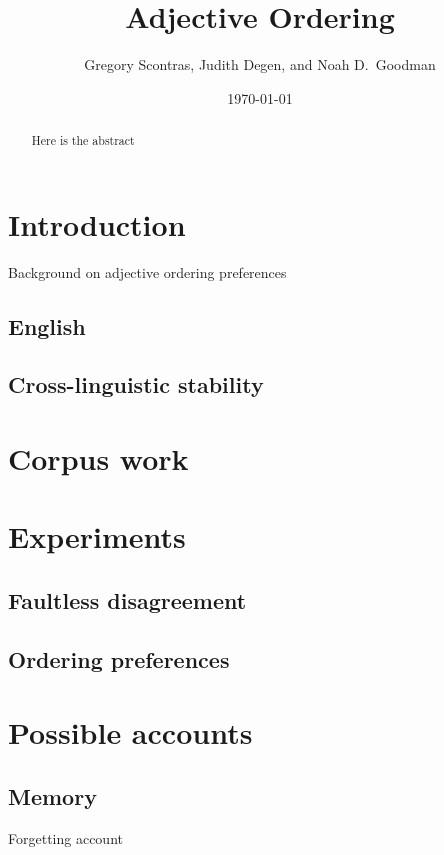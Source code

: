 \documentclass[11pt]{article}
\title{Adjective Ordering}
\author{Gregory Scontras, Judith Degen, and Noah D.~Goodman}
\date{\today}
\begin{document}
\thispagestyle{plain}

\maketitle

\begin{abstract}
	Here is the abstract
\end{abstract}


\section{Introduction}

Background on adjective ordering preferences

\subsection{English}

\subsection{Cross-linguistic stability}


\section{Corpus work}


\section{Experiments}

\subsection{Faultless disagreement}

\subsection{Ordering preferences}


\section{Possible accounts}


\subsection{Memory}

Forgetting account
\end{document}
